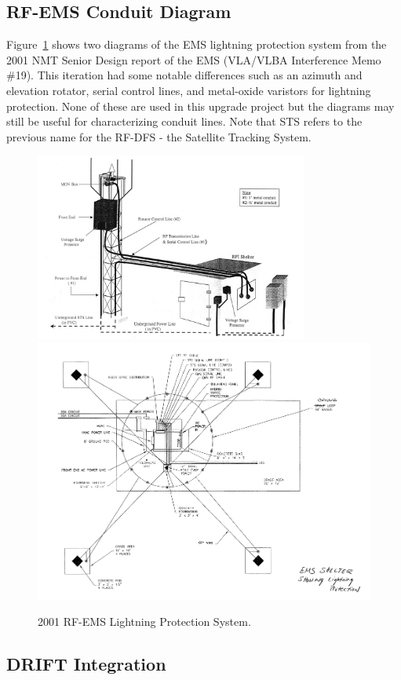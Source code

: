 \documentclass[titlepage]{article}
\begin{document}
\subsection{RF-EMS Conduit Diagram}
Figure~\ref{fig:oldems} shows two diagrams of the EMS lightning protection system from the 2001 NMT Senior Design report of the EMS (VLA/VLBA Interference Memo \#19). This iteration had some notable differences such as an azimuth and elevation rotator, serial control lines, and metal-oxide varistors for lightning protection. None of these are used in this upgrade project but the diagrams may still be useful for characterizing conduit lines. Note that STS refers to the previous name for the RF-DFS - the Satellite Tracking System.
\begin{figure}[!ht]
  \begin{center}
    \includegraphics[width=0.8\textwidth]{images/oldems.png}
    \includegraphics[width=\textwidth]{images/oldems2.png}
  \end{center}
  \caption{2001 RF-EMS Lightning Protection System.}\label{fig:oldems}
\end{figure}

\subsection{DRIFT Integration}
\end{document}
